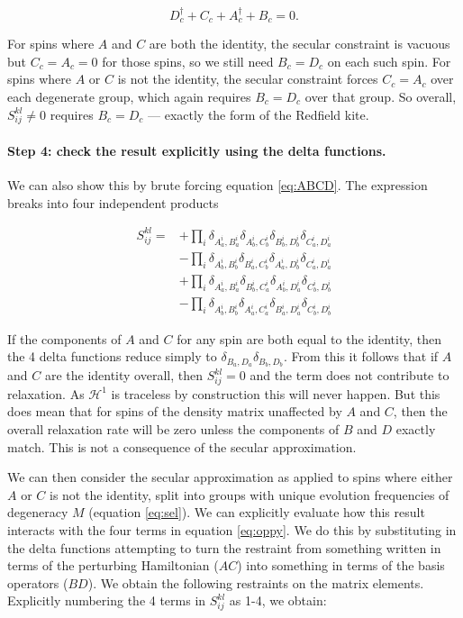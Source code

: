 \documentclass[notitlepage,11pt]{article}
\begin{document}
\begin{equation}
D_c^\dagger +C_c+A_c^\dagger + B_c=0.
\end{equation}

For spins where $A$ and $C$ are both the identity, the secular constraint is vacuous but $C_c=A_c=0$ for those spins, so we still need $B_c=D_c$ on each such spin. For spins where $A$ or $C$ is not the identity, the secular constraint forces $C_c=A_c$ over each degenerate group, which again requires $B_c=D_c$ over that group. So overall, $S_{ij}^{kl}\neq 0$ requires $B_c=D_c$ — exactly the form of the Redfield kite.

\paragraph{Step 4: check the result explicitly using the delta functions.}
 We can also show this by brute forcing equation \ref{eq:ABCD}. The expression breaks into four independent products

\begin{equation}
  \begin{split}
    S_{ij}^{kl} = 
    & + \prod_i \delta_{A_a^i,B_a^i} \delta_{A_b^i,C_b^i} \delta_{B_b^i,D_b^i} \delta_{C_a^i,D_a^i}  \\
    & - \prod_i \delta_{A_b^i,B_b^i} \delta_{B_a^i,C_b^i} \delta_{A_a^i,D_b^i} \delta_{C_a^i,D_a^i}   \\
    & + \prod_i \delta_{A_a^i,B_a^i} \delta_{B_b^i,C_a^i} \delta_{A_b^i,D_a^i} \delta_{C_b^i,D_b^i}   \\
    & -  \prod_i \delta_{A_b^i,B_b^i} \delta_{A_a^i,C_a^i} \delta_{B_a^i,D_a^i} \delta_{C_b^i,D_b^i}   
    \label{eq:oppy}
  \end{split}
     \end{equation}


If the components of $A$ and $C$ for any spin are both equal to the identity, then the 4 delta functions reduce simply to $\delta_{B_a,D_a}\delta_{B_b,D_b}$. From this it follows that if $A$ and $C$ are the identity overall, then $S_{ij}^{kl}=0$ and the term does not contribute to relaxation. As $\mathcal{H}^1$ is traceless by construction this will never happen. But this does mean that for spins of the density matrix unaffected by $A$ and $C$, then the overall relaxation rate will be zero unless the components of $B$ and $D$ exactly match. This is not a consequence of the secular approximation.

We can then consider the secular approximation as applied to spins where either $A$ or $C$ is not the identity, split into groups with unique evolution frequencies of degeneracy $M$ (equation \ref{eq:sel}). We can explicitly evaluate how this result interacts with the four terms in equation \ref{eq:oppy}. We do this by substituting in the delta functions attempting to turn the restraint from something written in terms of the perturbing Hamiltonian ($AC$) into something in terms of the basis operators ($BD$). We obtain the following restraints on the matrix elements. Explicitly numbering the 4 terms in $S_{ij}^{kl}$ as 1-4, we obtain:
\end{document}
